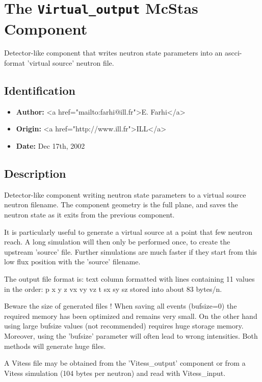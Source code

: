 \section{The \texttt{Virtual\_output} McStas Component}
Detector-like component that writes neutron state parameters into an ascci-format
'virtual source' neutron file.

\subsection*{Identification}
\begin{itemize}
  \item \textbf{Author:} \textless{}a href="mailto:farhi@ill.fr"\textgreater{}E. Farhi\textless{}/a\textgreater{}
  \item \textbf{Origin:} \textless{}a href="http://www.ill.fr"\textgreater{}ILL\textless{}/a\textgreater{}
  \item \textbf{Date:} Dec 17th, 2002
\end{itemize}

\subsection*{Description}
Detector-like component writing neutron state parameters to a virtual source neutron filename. The component geometry is the full plane, and saves the neutron state as it exits from the previous component.

It is particularly useful to generate a virtual source at a point that few neutron reach. A long simulation will then only be performed once, to create the upstream 'source' file. Further simulations are much faster if they start from this low flux position with the 'source' filename.

The output file format is: text column formatted with lines containing 11 values in the order: p x y z vx vy vz t sx sy sz stored into about 83 bytes/n.

Beware the size of generated files ! When saving all events (bufsize=0) the required memory has been optimized and remains very small. On the other hand using large bufsize values (not recommended) requires huge storage memory. Moreover, using the 'bufsize' parameter will often lead to wrong intensities. Both methods will generate huge files.

A Vitess file may be obtained from the 'Vitess\_output' component or from a Vitess simulation (104 bytes per neutron) and read with Vitess\_input.

